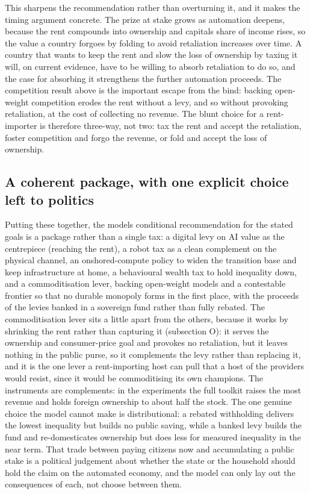 \documentclass[12pt]{article}
\begin{document}
This sharpens the recommendation rather than overturning it, and it
makes the timing argument concrete. The prize at stake grows as
automation deepens, because the rent compounds into ownership and
capital\textquotesingle s share of income rises, so the value a country
forgoes by folding to avoid retaliation increases over time. A country
that wants to keep the rent and slow the loss of ownership by taxing it
will, on current evidence, have to be willing to absorb retaliation to
do so, and the case for absorbing it strengthens the further automation
proceeds. The competition result above is the important escape from the
bind: backing open-weight competition erodes the rent without a levy,
and so without provoking retaliation, at the cost of collecting no
revenue. The blunt choice for a rent-importer is therefore three-way,
not two: tax the rent and accept the retaliation, foster competition and
forgo the revenue, or fold and accept the loss of ownership.

\hypertarget{a-coherent-package-with-one-explicit-choice-left-to-politics}{%
\subsection{A coherent package, with one explicit choice left to
politics}\label{a-coherent-package-with-one-explicit-choice-left-to-politics}}

Putting these together, the model\textquotesingle s conditional
recommendation for the stated goals is a package rather than a single
tax: a digital levy on AI value as the centrepiece (reaching the rent),
a robot tax as a clean complement on the physical channel, an
onshored-compute policy to widen the transition base and keep
infrastructure at home, a behavioural wealth tax to hold inequality
down, and a commoditisation lever, backing open-weight models and a
contestable frontier so that no durable monopoly forms in the first
place, with the proceeds of the levies banked in a sovereign fund rather
than fully rebated. The commoditisation lever sits a little apart from
the others, because it works by shrinking the rent rather than capturing
it (subsection O): it serves the ownership and consumer-price goal and
provokes no retaliation, but it leaves nothing in the public purse, so
it complements the levy rather than replacing it, and it is the one lever
a rent-importing host can pull that a host of the providers would resist,
since it would be commoditising its own champions. The instruments are complements: in the experiments the full
toolkit raises the most revenue and holds foreign ownership to about
half the stock. The one genuine choice the model cannot make is
distributional: a rebated withholding delivers the lowest inequality but
builds no public saving, while a banked levy builds the fund and
re-domesticates ownership but does less for measured inequality in the
near term. That trade between paying citizens now and accumulating a
public stake is a political judgement about whether the state or the
household should hold the claim on the automated economy, and the model
can only lay out the consequences of each, not choose between them.
\end{document}
